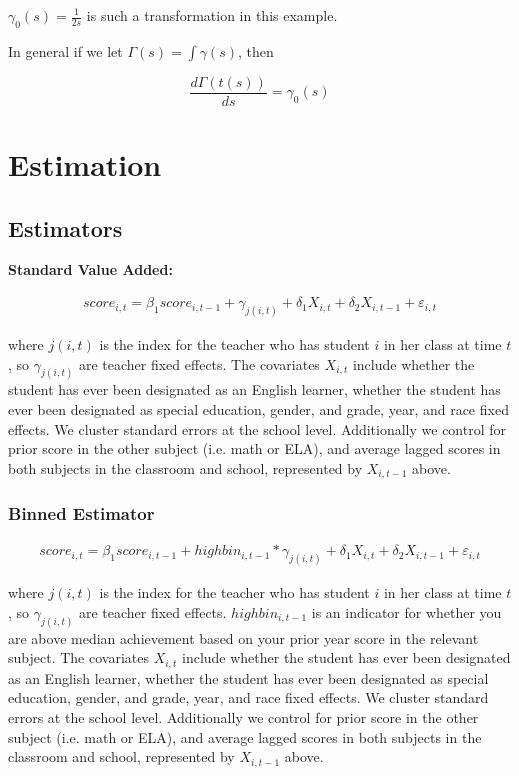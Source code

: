 \documentclass{article}
\theoremstyle{definition}
\theoremstyle{definition}
\theoremstyle{definition}
\theoremstyle{definition}
\begin{document}
    $\gamma_0(s) = \frac{1}{2s}$ is such a transformation in this example. 
    
    In general if we let $\Gamma(s) = \int \gamma(s)$, then 
    
    $$ \frac{d \Gamma(t(s)) }{ ds} = \gamma_0(s) $$
    



\section{Estimation}

    \subsection{Estimators}
    \noindent \textbf{Standard Value Added:}
    
    \begin{align*}
        score_{i,t} = \beta_1 score_{i,t-1} + \gamma_{j(i, t)} + \delta_1 X_{i, t} + \delta_2 X_{i, t-1} + \varepsilon_{i, t}
    \end{align*}
    
    \noindent where $j(i, t)$ is the index for the teacher who has student $i$ in her class at time $t$, so $\gamma_{j(i, t)}$ are teacher fixed effects. The covariates $X_{i, t}$ include whether the student has ever been designated as an English learner, whether the student has ever been designated as special education, gender, and grade, year, and race fixed effects. We cluster standard errors at the school level. Additionally we control for prior score in the other subject (i.e. math or ELA), and average lagged scores in both subjects in the classroom and school, represented by $X_{i, t-1}$ above.

        \subsubsection{Binned Estimator}
        
        \begin{align*}
            score_{i,t} = \beta_1 score_{i,t-1} + highbin_{i,t-1}*\gamma_{j(i, t)} + \delta_1 X_{i, t} + \delta_2 X_{i, t-1} + \varepsilon_{i, t}
        \end{align*}
        
        \noindent where $j(i, t)$ is the index for the teacher who has student $i$ in her class at time $t$, so $\gamma_{j(i, t)}$ are teacher fixed effects. $highbin_{i,t-1}$ is an indicator for whether you are above median achievement based on your prior year score in the relevant subject. The covariates $X_{i, t}$ include whether the student has ever been designated as an English learner, whether the student has ever been designated as special education, gender, and grade, year, and race fixed effects. We cluster standard errors at the school level. Additionally we control for prior score in the other subject (i.e. math or ELA), and average lagged scores in both subjects in the classroom and school, represented by $X_{i, t-1}$ above.
\end{document}
